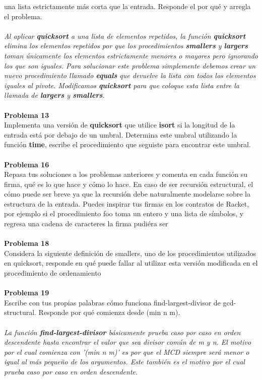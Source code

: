 \documentclass[14pt]{article}
\begin{document}
	una lista estrictamente más corta que la entrada. Responde el por qué y arregla el problema.
	\\
	\\\textit{Al aplicar \textbf{quicksort} a una lista de elementos repetidos, la función \textbf{quicksort} elimina los elementos repetidos por que los procedimientos \textbf{smallers} y \textbf{largers} toman únicamente los elementos estrictamente menores o mayores pero ignorando los que son iguales. Para solucionar este problema simplemente debemos crear un nuevo procedimiento llamado \textbf{equals} que devuelve la lista con todos los elementos iguales al pivote. Modificamos \textbf{quicksort} para que coloque esta lista entre la llamada de \textbf{largers} y \textbf{smallers}.}
	\\
	\\{\large\textbf{Problema 13}}
	\\Implementa una versión de \textbf{quicksort} que utilice \textbf{isort} si la longitud de la entrada está por debajo de un umbral. Determina este umbral utilizando la función \textbf{time}, escribe el procedimiento que seguiste para encontrar este umbral.
	\\
	\\{\large\textbf{Problema 16}}
	\\Repasa tus soluciones a los problemas anteriores y comenta en cada función su firma,
	qué es lo que hace y cómo lo hace. En caso de ser recursión estructural, el cómo puede ser breve ya
	que la recursión debe naturalmente modelarse sobre la estructura de la entrada. Puedes inspirar
	tus firmas en los contratos de Racket, por ejemplo si el procedimiento foo toma un entero y una
	lista de símbolos, y regresa una cadena de caracteres la firma pudiéra ser
	\\
	\\{\large\textbf{Problema 18}}
	\\ Considera la siguiente definición de smallers, uno de los procedimientos utilizados
	en quicksort, responde en qué puede fallar al utilizar esta versión modificada en el procedimiento
	de ordenamiento
	\\
	\\{\large\textbf{Problema 19}}
	\\Escribe con tus propias palabras cómo funciona find-largest-divisor de gcd-structural. Responde por qué comienza desde (min n m).
	\\
	\\\textit{La función \textbf{find-largest-divisor} básicamente prueba caso por caso en orden descendente hasta encontrar	el valor que sea divisor común de m y n. El motivo por el cual comienza con '(min n m)' es por que el MCD siempre será menor o igual al más pequeño de los argumentos. Este también es el motivo por el cual prueba caso por caso en orden descendente.}
\end{document}
